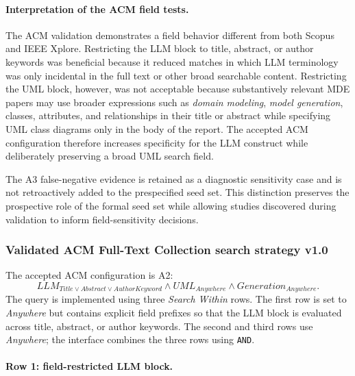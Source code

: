\paragraph{Interpretation of the ACM field tests.}
The ACM validation demonstrates a field behavior different from both Scopus and
IEEE Xplore. Restricting the LLM block to title, abstract, or author keywords
was beneficial because it reduced matches in which LLM terminology was only
incidental in the full text or other broad searchable content. Restricting the
UML block, however, was not acceptable because substantively relevant MDE
papers may use broader expressions such as \emph{domain modeling},
\emph{model generation}, classes, attributes, and relationships in their title
or abstract while specifying UML class diagrams only in the body of the report.
The accepted ACM configuration therefore increases specificity for the LLM
construct while deliberately preserving a broad UML search field.

The A3 false-negative evidence is retained as a diagnostic sensitivity case and
is not retroactively added to the prespecified seed set. This distinction
preserves the prospective role of the formal seed set while allowing studies
discovered during validation to inform field-sensitivity decisions.

\subsubsection{Validated ACM Full-Text Collection search strategy v1.0}

The accepted ACM configuration is A2:
\[
LLM_{Title\lor Abstract\lor AuthorKeyword}
\land
UML_{Anywhere}
\land
Generation_{Anywhere}.
\]
The query is implemented using three \emph{Search Within} rows. The first row is
set to \emph{Anywhere} but contains explicit field prefixes so that the LLM
block is evaluated across title, abstract, or author keywords. The second and
third rows use \emph{Anywhere}; the interface combines the three rows using
\texttt{AND}.

\paragraph{Row 1: field-restricted LLM block.}

